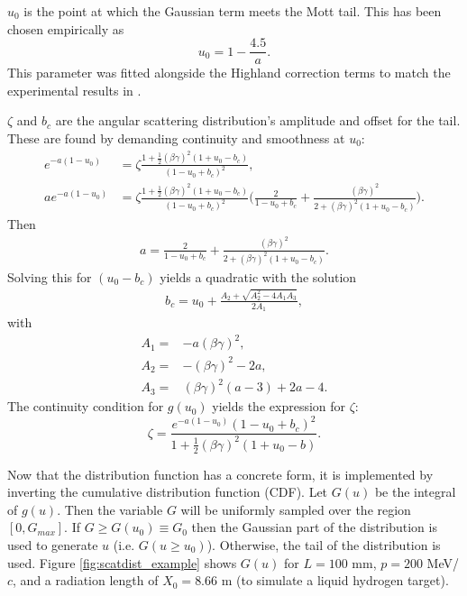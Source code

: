 $u_0$ is the point at which the Gaussian term meets the Mott tail. This has been chosen empirically as
\begin{equation}\label{eqn:cosyu0}
u_0=1-\frac{4.5}{a}.
\end{equation}
This parameter was fitted alongside the Highland correction terms to match the experimental results in \cite{muscat}.

$\zeta$ and $b_c$ are the angular scattering distribution's amplitude and offset for the tail. These are found by demanding continuity and smoothness at $u_0$:
\begin{align*}
e^{-a(1-u_0)}&=\zeta\frac{1+\frac{1}{2}(\beta\gamma)^2(1+u_0-b_c)}{(1-u_0+b_c)^2},\\
ae^{-a(1-u_0)}&=\zeta\frac{1+\frac{1}{2}(\beta\gamma)^2(1+u_0-b_c)}{(1-u_0+b_c)^2} \Big(\frac{2}{1-u_0+b_c}+\frac{(\beta\gamma)^2}{2+(\beta\gamma)^2(1+u_0-b_c)}\Big).
\end{align*}
Then
\begin{align*}
a=\frac{2}{1-u_0+b_c}+\frac{(\beta\gamma)^2}{2+(\beta\gamma)^2(1+u_0-b_c)}.
\end{align*}
Solving this for $(u_0-b_c)$ yields a quadratic with the solution
\begin{align} \label{eqn:cosybc}
b_c=u_0+\frac{A_2 + \sqrt{A_2 ^2 - 4A_1 A_3}}{2A_1},
\end{align}
with
\begin{align*}
A_1=&-a(\beta\gamma)^2,\\
A_2=&-(\beta\gamma)^2-2a,\\
A_3=&(\beta\gamma)^2(a-3)+2a-4.
\end{align*}
The continuity condition for $g(u_0)$ yields the expression for $\zeta$:
\begin{equation}\label{eqn:cosyzeta}
\zeta=\frac{e^{-a(1-u_0)}(1-u_0+b_c)^2}{1+\frac{1}{2}(\beta\gamma)^2(1+u_0-b)}.
\end{equation}

Now that the distribution function has a concrete form, it is implemented by inverting the cumulative distribution function (CDF).  Let $G(u)$ be the integral of $g(u)$. Then the variable $G$ will be uniformly sampled over the region $[0,G_{max}]$. If $G\geq G(u_0) \equiv G_0$ then the Gaussian part of the distribution is used to generate $u$ (i.e. $G(u\geq u_0)$). Otherwise, the tail of the distribution is used. Figure \ref{fig:scatdist_example} shows $G(u)$ for $L=100$ mm, $p=200$ MeV/$c$, and a radiation length of $X_0 = 8.66$ m (to simulate a liquid hydrogen target).

